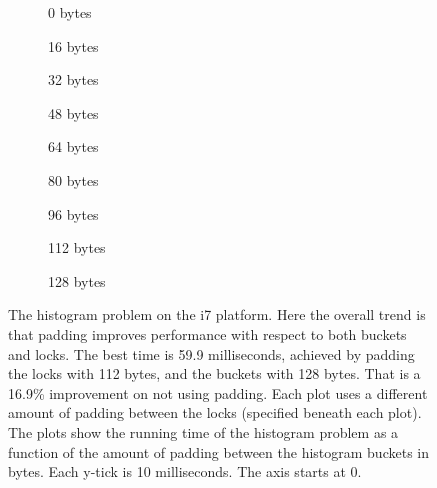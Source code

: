 \begin{figure}[hbpt]
	\graphicspath{{plots/}}
	\begin{subfigure}{0.32\textwidth}
		
		\caption{0 bytes}
	\end{subfigure}
	\begin{subfigure}{0.32\textwidth}
		
		\caption{16 bytes}
	\end{subfigure}
	\begin{subfigure}{0.32\textwidth}
		
		\caption{32 bytes}
	\end{subfigure}
	\begin{subfigure}{0.32\textwidth}
		
		\caption{48 bytes}
	\end{subfigure}
	\begin{subfigure}{0.32\textwidth}
		
		\caption{64 bytes}
	\end{subfigure}
	\begin{subfigure}{0.32\textwidth}
		
		\caption{80 bytes}
	\end{subfigure}
	\begin{subfigure}{0.32\textwidth}
		
		\caption{96 bytes}
	\end{subfigure}
	\begin{subfigure}{0.32\textwidth}
		
		\caption{112 bytes}
	\end{subfigure}
	\begin{subfigure}{0.32\textwidth}
		
		\caption{128 bytes}
	\end{subfigure}
	\caption{The histogram problem on the i7 platform. Here the overall
	trend is that padding improves performance with respect to both buckets
	and locks. The best time is 59.9 milliseconds, achieved by padding the
	locks with 112 bytes, and the buckets with 128 bytes. That is a 16.9\%
	improvement on not using padding. Each plot uses a different amount of
	padding between the locks (specified beneath each plot). The plots show
	the running time of the histogram problem as a function of the amount of
	padding between the histogram buckets in bytes. Each y-tick is 10
	milliseconds. The axis starts at 0.} \label{fig:histo-i7}
\end{figure}

